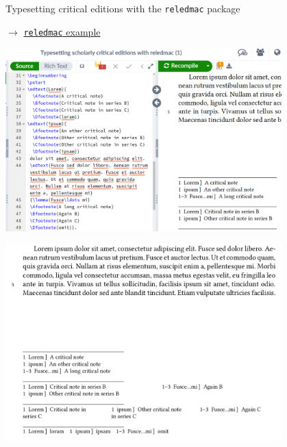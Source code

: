 \begin{frame}{Typesetting critical editions with the \texttt{reledmac} package}
    
    $\to$ \href{https://www.overleaf.com/latex/examples/typesetting-scholarly-critical-editions-with-reledmac/vwfgrsxqncvv}{\texttt{reledmac} example}
    
    \includegraphics[width=0.8\textwidth]{img/overleaf-reledmac.png}
    
    \framebreak
    
    \includegraphics[width=0.8\textwidth]{img/overleaf-reledmac-pdf.png}
    
    \framebreak
    

\end{frame}

